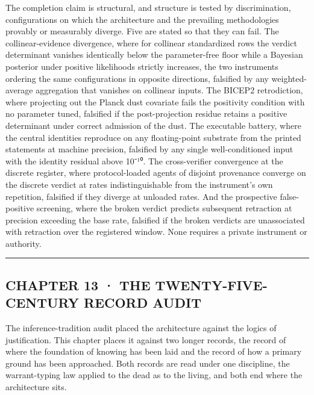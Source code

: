 \documentclass[10pt,twocolumn]{article}
\begin{document}
The completion claim is structural, and structure is tested by
discrimination, configurations on which the architecture and the
prevailing methodologies provably or measurably diverge. Five are stated
so that they can fail. The collinear-evidence divergence, where for
collinear standardized rows the verdict determinant vanishes identically
below the parameter-free floor while a Bayesian posterior under positive
likelihoods strictly increases, the two instruments ordering the same
configurations in opposite directions, falsified by any weighted-average
aggregation that vanishes on collinear inputs. The BICEP2 retrodiction,
where projecting out the Planck dust covariate fails the positivity
condition with no parameter tuned, falsified if the post-projection
residue retains a positive determinant under correct admission of the
dust. The executable battery, where the central identities reproduce on
any floating-point substrate from the printed statements at machine
precision, falsified by any single well-conditioned input with the
identity residual above 10⁻¹⁰. The cross-verifier convergence at the
discrete register, where protocol-loaded agents of disjoint provenance
converge on the discrete verdict at rates indistinguishable from the
instrument's own repetition, falsified if they diverge at unloaded
rates. And the prospective false-positive screening, where the broken
verdict predicts subsequent retraction at precision exceeding the base
rate, falsified if the broken verdicts are unassociated with retraction
over the registered window. None requires a private instrument or
authority.

\begin{center}\rule{0.5\linewidth}{0.5pt}\end{center}

\hypertarget{chapter-13-the-twenty-five-century-record-audit}{%
\subsection{CHAPTER 13 · THE TWENTY-FIVE-CENTURY RECORD
AUDIT}\label{chapter-13-the-twenty-five-century-record-audit}}

The inference-tradition audit placed the architecture against the logics
of justification. This chapter places it against two longer records, the
record of where the foundation of knowing has been laid and the record
of how a primary ground has been approached. Both records are read under
one discipline, the warrant-typing law applied to the dead as to the
living, and both end where the architecture sits.
\end{document}
